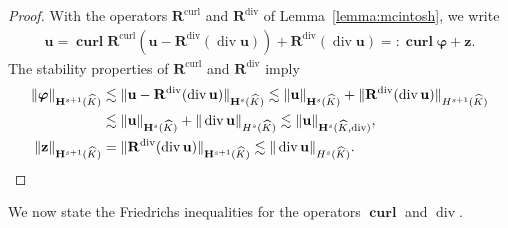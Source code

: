 \documentclass{article}
\begin{document}
\begin{proof}
With the operators $\mathbf{R}^{\operatorname*{curl}}$ and $\mathbf{R}^{\operatorname*{div}}$ of Lemma~\ref{lemma:mcintosh}, we write
\begin{align*}
{\mathbf{u}}=\operatorname*{\mathbf{curl}} \mathbf{R}^{\operatorname*{curl}}({\mathbf{u}}-{\mathbf{R}%
}^{\operatorname*{div}}(\operatorname*{div}{\mathbf{u}}))+{\mathbf{R}%
}^{\operatorname*{div}}(\operatorname*{div}{\mathbf{u}})
=:\operatorname*{\mathbf{curl}} \boldsymbol{\varphi} + {\mathbf z}.
\end{align*}
The stability properties of $\mathbf{R}^{\operatorname*{curl}}$ and $\mathbf{R}^{\operatorname*{div}}$ imply
\begin{align*}
\Vert\boldsymbol{\varphi}\Vert_{\mathbf{H}^{s+1}(\widehat{K})} &\lesssim \Vert \mathbf{u}-\mathbf{R}^{\operatorname*{div}}(\operatorname*{div}\mathbf{u})\Vert_{\mathbf{H}^s(\widehat{K})} \lesssim \Vert\mathbf{u}\Vert_{\mathbf{H}^s(\widehat{K})} + \Vert\mathbf{R}^{\operatorname{div}}(\operatorname*{div}\mathbf{u})\Vert_{H^{s+1}(\widehat{K})} \\
&\lesssim \Vert\mathbf{u}\Vert_{\mathbf{H}^s(\widehat{K})} + \Vert\operatorname*{div}\mathbf{u}\Vert_{H^s(\widehat{K})} \lesssim \Vert\mathbf{u}\Vert_{\mathbf{H}^s(\widehat{K},\operatorname*{div})}, \\
\Vert\mathbf{z}\Vert_{\mathbf{H}^{s+1}(\widehat{K})} &= \Vert\mathbf{R}^{\operatorname*{div}}(\operatorname*{div}\mathbf{u})\Vert_{\mathbf{H}^{s+1}(\widehat{K})} \lesssim \Vert\operatorname*{div}\mathbf{u}\Vert_{H^s(\widehat{K})}.
\qedhere
\end{align*}
\end{proof}

We now state the Friedrichs inequalities for the operators $\operatorname{\mathbf{curl}}$ and $\operatorname{div}$.
\end{document}
